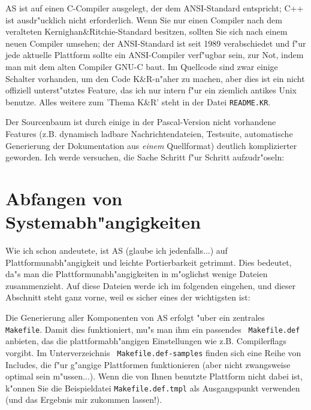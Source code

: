 \documentclass[12pt,a4paper,twoside]{report}
\begin{document}
{AS ist auf einen C-Compiler ausgelegt, der dem ANSI-Standard entspricht;
C++ ist ausdr"ucklich nicht erforderlich.  Wenn Sie nur einen Compiler
nach dem veralteten Kernighan\&Ritchie-Standard besitzen, sollten Sie sich
nach einem neuen Compiler umsehen; der ANSI-Standard ist seit 1989
verabschiedet und f"ur jede aktuelle Plattform sollte ein ANSI-Compiler
verf"ugbar sein, zur Not, indem man mit dem alten Compiler GNU-C baut.  Im
Quellcode sind zwar einige Schalter vorhanden, um den Code K\&R-n"aher zu
machen, aber dies ist ein nicht offiziell unterst"utztes Feature, das ich
nur intern f"ur ein ziemlich antikes Unix benutze.  Alles weitere zum
'Thema K\&R' steht in der Datei {\tt README.KR}.

Der Sourcenbaum ist durch einige in der Pascal-Version nicht vorhandene
Features (z.B. dynamisch ladbare Nachrichtendateien, Testsuite,
automatische Generierung der Dokumentation aus {\em einem} Quellformat)
deutlich komplizierter geworden.  Ich werde versuchen, die Sache Schritt
f"ur Schritt aufzudr"oseln:


\section{Abfangen von Systemabh"angigkeiten}

Wie ich schon andeutete, ist AS (glaube ich jedenfalls...) auf
Plattformunabh"angigkeit und leichte Portierbarkeit getrimmt.  Dies
bedeutet, da"s man die Platt\-form\-un\-ab\-h"an\-gig\-kei\-ten in
m"oglichst wenige Dateien zusammenzieht.  Auf diese Dateien werde ich im
folgenden eingehen, und dieser Abschnitt steht ganz vorne, weil es sicher
eines der wichtigsten ist:

Die Generierung aller Komponenten von AS erfolgt "uber ein zentrales {\tt
Makefile}.  Damit dies funktioniert, mu"s man ihm ein passendes {\tt
Makefile.def} anbieten, das die plattformabh"angigen Einstellungen wie
z.B. Compilerflags vorgibt.  Im Unterverzeichnis {\tt
Makefile.def-samples} finden sich eine Reihe von Includes, die f"ur
g"angige Plattformen funktionieren (aber nicht zwangsweise optimal sein
m"ussen...).  Wenn die von Ihnen benutzte Plattform nicht dabei ist,
k"onnen Sie die Beispieldatei {\tt Makefile.def.tmpl} als Ausgangspunkt
verwenden (und das Ergebnis mir zukommen lassen!).  

}
\end{document}
